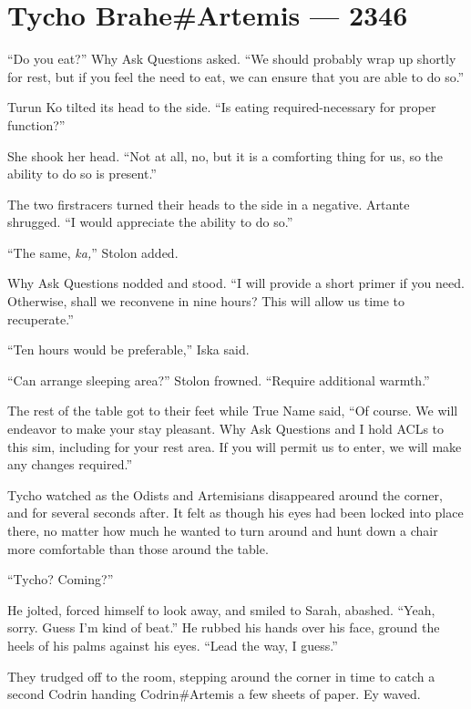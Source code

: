 \hypertarget{tycho-braheartemis-2346}{%
\chapter{Tycho Brahe\#Artemis — 2346}\label{tycho-braheartemis-2346}}

``Do you eat?'' Why Ask Questions asked. ``We should probably wrap up shortly for rest, but if you feel the need to eat, we can ensure that you are able to do so.''

Turun Ko tilted its head to the side. ``Is eating required-necessary for proper function?''

She shook her head. ``Not at all, no, but it is a comforting thing for us, so the ability to do so is present.''

The two firstracers turned their heads to the side in a negative. Artante shrugged. ``I would appreciate the ability to do so.''

``The same, \emph{ka,}'' Stolon added.

Why Ask Questions nodded and stood. ``I will provide a short primer if you need. Otherwise, shall we reconvene in nine hours? This will allow us time to recuperate.''

``Ten hours would be preferable,'' Iska said.

``Can arrange sleeping area?'' Stolon frowned. ``Require additional warmth.''

The rest of the table got to their feet while True Name said, ``Of course. We will endeavor to make your stay pleasant. Why Ask Questions and I hold ACLs to this sim, including for your rest area. If you will permit us to enter, we will make any changes required.''

Tycho watched as the Odists and Artemisians disappeared around the corner, and for several seconds after. It felt as though his eyes had been locked into place there, no matter how much he wanted to turn around and hunt down a chair more comfortable than those around the table.

``Tycho? Coming?''

He jolted, forced himself to look away, and smiled to Sarah, abashed. ``Yeah, sorry. Guess I'm kind of beat.'' He rubbed his hands over his face, ground the heels of his palms against his eyes. ``Lead the way, I guess.''

They trudged off to the room, stepping around the corner in time to catch a second Codrin handing Codrin\#Artemis a few sheets of paper. Ey waved.

